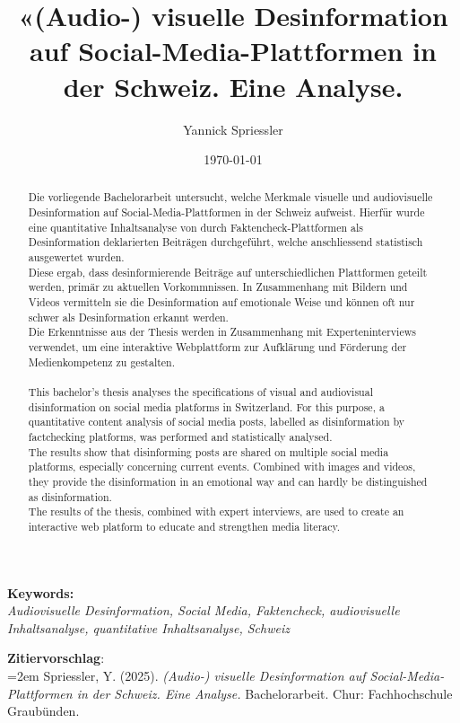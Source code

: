 \documentclass[12pt,a4paper]{article}        %
\title{«(Audio-) visuelle Desinformation auf Social-Media-Plattformen in der Schweiz. Eine Analyse.}        %
\author{Yannick Spriessler}     %
\date{\today}     %
\begin{document}
\begin{titlingpage} %
  
  \nocite{howard_trees_2017}  %
\end{titlingpage}
\pagebreak      %
\renewcommand{\abstractname}{Abstract}
\begin{abstract}
  \setlength{\parindent}{0pt}
Die vorliegende Bachelorarbeit untersucht, welche Merkmale visuelle und audiovisuelle Desinformation auf Social-Media-Plattformen in der Schweiz aufweist. Hierfür wurde eine quantitative Inhaltsanalyse von durch Faktencheck-Plattformen als Desinformation deklarierten Beiträgen durchgeführt, welche anschliessend statistisch ausgewertet wurden.\\
Diese ergab, dass desinformierende Beiträge auf unterschiedlichen Plattformen geteilt werden, primär zu aktuellen Vorkommnissen. In Zusammenhang mit Bildern und Videos vermitteln sie die Desinformation auf emotionale Weise und können oft nur schwer als Desinformation erkannt werden.\\
Die Erkenntnisse aus der Thesis werden in Zusammenhang mit Experteninterviews verwendet, um eine interaktive Webplattform zur Aufklärung und Förderung der Medienkompetenz zu gestalten.
\\
\\
This bachelor's thesis analyses the specifications of visual and audiovisual disinformation on social media platforms in Switzerland. For this purpose, a quantitative content analysis of social media posts, labelled as disinformation by factchecking platforms, was performed and statistically analysed.\\
The results show that disinforming posts are shared on multiple social media platforms, especially concerning current events. Combined with images and videos, they provide the disinformation in an emotional way and can hardly be distinguished as disinformation.\\
The results of the thesis, combined with expert interviews, are used to create an interactive web platform to educate and strengthen media literacy.
\end{abstract}

\vfill
\textbf{Keywords:}\\ \textit{Audiovisuelle Desinformation, Social Media, Faktencheck, audiovisuelle Inhaltsanalyse, quantitative Inhaltsanalyse, Schweiz}

\textbf{Zitiervorschlag}:\\
\hangindent=2em
Spriessler, Y. (2025). \textit{(Audio-) visuelle Desinformation auf Social-Media-Plattformen in der Schweiz. Eine Analyse.} Bachelorarbeit. Chur: Fachhochschule Graubünden.
\end{document}
